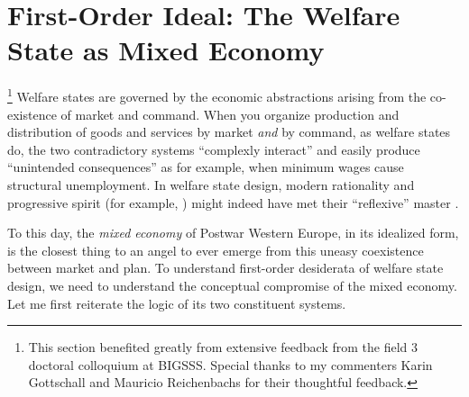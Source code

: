 

\section{First-Order Ideal: The Welfare State as Mixed Economy} \label{sec:mixed-economy}
\footnote{
	This section benefited greatly from extensive feedback from the field 3 doctoral colloquium at \gls{BIGSSS}.
	Special thanks to my commenters Karin Gottschall and Mauricio Reichenbachs for their thoughtful feedback.
}
Welfare states are governed by the economic abstractions arising from the co-existence of market and command.
When you organize production and distribution of goods and services by market \emph{and} by command, as welfare states do, the two contradictory systems ``complexly interact'' \citep{Perrow-1999-aa} and easily produce ``unintended consequences'' \citep{Merton-1936-aa} as for example, when minimum wages cause structural unemployment. In welfare state design, modern rationality \citep{Weber-1920-aa} and progressive spirit (for example, \citealt{Offe2010}) might indeed have met their ``reflexive'' master \citep{BeckBonss-2003-aa}.

To this day, the \emph{mixed economy} of Postwar Western Europe, in its idealized form, is the closest thing to an angel to ever emerge from this uneasy coexistence between market and plan. To understand first-order desiderata of welfare state design, we need to understand the  conceptual compromise of the mixed economy. Let me first reiterate the logic of its two constituent systems.

